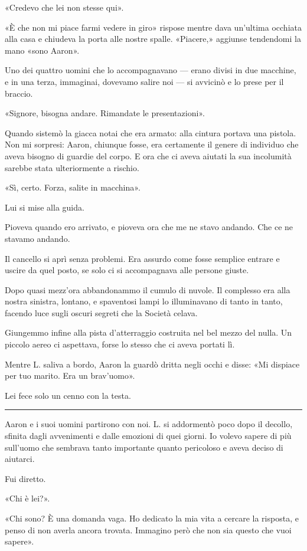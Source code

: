 \documentclass[a4paper,10pt]{memoir}
\begin{document}
«Credevo che lei non stesse qui».

«È che non mi piace farmi vedere in giro» rispose mentre dava un'ultima occhiata alla casa e chiudeva la porta alle
nostre spalle. «Piacere,» aggiunse tendendomi la mano «sono Aaron».

Uno dei quattro uomini che lo accompagnavano --- erano divisi in due macchine, e in una terza, immaginai, dovevamo
salire noi --- si avvicinò e lo prese per il braccio.

«Signore, bisogna andare. Rimandate le presentazioni».

Quando sistemò la giacca notai che era armato: alla cintura portava una pistola. Non mi sorpresi: Aaron, chiunque fosse,
era certamente il genere di individuo che aveva bisogno di guardie del corpo. E ora che ci aveva aiutati la sua
incolumità sarebbe stata ulteriormente a rischio.

«Sì, certo. Forza, salite in macchina».

Lui si mise alla guida.

Pioveva quando ero arrivato, e pioveva ora che me ne stavo andando. Che ce ne stavamo andando.

Il cancello si aprì senza problemi. Era assurdo come fosse semplice entrare e uscire da quel posto, se solo ci si
accompagnava alle persone giuste.

Dopo quasi mezz'ora abbandonammo il cumulo di nuvole. Il complesso era alla nostra sinistra, lontano, e spaventosi lampi
lo illuminavano di tanto in tanto, facendo luce sugli oscuri segreti che la Società celava.

Giungemmo infine alla pista d'atterraggio costruita nel bel mezzo del nulla. Un piccolo aereo ci aspettava, forse lo
stesso che ci aveva portati lì.

Mentre L. saliva a bordo, Aaron la guardò dritta negli occhi e disse: «Mi dispiace per tuo marito. Era un brav'uomo».

Lei fece solo un cenno con la testa.

\plainbreak{1}

Aaron e i suoi uomini partirono con noi. L. si addormentò poco dopo il decollo, sfinita dagli avvenimenti e dalle
emozioni di quei giorni. Io volevo sapere di più sull'uomo che sembrava tanto importante quanto pericoloso e aveva
deciso di aiutarci.

Fui diretto.

«Chi è lei?».

«Chi sono? È una domanda vaga. Ho dedicato la mia vita a cercare la risposta, e penso di non averla ancora trovata.
Immagino però che non sia questo che vuoi sapere».
\end{document}
